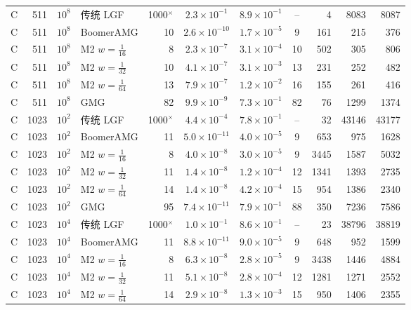\begin{longtable}{lrrlrcccrrr}
C & 511 & $10^{8}$ & 传统 LGF & 1000$^\times$ & $2.3{\times}10^{-1}$ & $8.9{\times}10^{-1}$ & -- & 4 & 8083 & 8087 \\
C & 511 & $10^{8}$ & BoomerAMG & 10 & $2.6{\times}10^{-10}$ & $1.7{\times}10^{-5}$ & 9 & 161 & 215 & 376 \\
C & 511 & $10^{8}$ & M2 $w{=}\frac1{16}$ & 8 & $2.3{\times}10^{-7}$ & $3.1{\times}10^{-4}$ & 10 & 502 & 305 & 806 \\
C & 511 & $10^{8}$ & M2 $w{=}\frac1{32}$ & 10 & $4.1{\times}10^{-7}$ & $3.1{\times}10^{-3}$ & 13 & 231 & 252 & 482 \\
C & 511 & $10^{8}$ & M2 $w{=}\frac1{64}$ & 13 & $7.9{\times}10^{-7}$ & $1.2{\times}10^{-2}$ & 16 & 155 & 261 & 416 \\
C & 511 & $10^{8}$ & GMG & 82 & $9.9{\times}10^{-9}$ & $7.3{\times}10^{-1}$ & 82 & 76 & 1299 & 1374 \\
C & 1023 & $10^{2}$ & 传统 LGF & 1000$^\times$ & $4.4{\times}10^{-4}$ & $7.8{\times}10^{-1}$ & -- & 32 & 43146 & 43177 \\
C & 1023 & $10^{2}$ & BoomerAMG & 11 & $5.0{\times}10^{-11}$ & $4.0{\times}10^{-5}$ & 9 & 653 & 975 & 1628 \\
C & 1023 & $10^{2}$ & M2 $w{=}\frac1{16}$ & 8 & $4.0{\times}10^{-8}$ & $3.0{\times}10^{-5}$ & 9 & 3445 & 1587 & 5032 \\
C & 1023 & $10^{2}$ & M2 $w{=}\frac1{32}$ & 11 & $1.4{\times}10^{-8}$ & $1.2{\times}10^{-4}$ & 12 & 1341 & 1393 & 2735 \\
C & 1023 & $10^{2}$ & M2 $w{=}\frac1{64}$ & 14 & $1.4{\times}10^{-8}$ & $4.2{\times}10^{-4}$ & 15 & 954 & 1386 & 2340 \\
C & 1023 & $10^{2}$ & GMG & 95 & $7.4{\times}10^{-11}$ & $7.9{\times}10^{-1}$ & 88 & 350 & 7236 & 7586 \\
C & 1023 & $10^{4}$ & 传统 LGF & 1000$^\times$ & $1.0{\times}10^{-1}$ & $8.6{\times}10^{-1}$ & -- & 23 & 38796 & 38819 \\
C & 1023 & $10^{4}$ & BoomerAMG & 11 & $8.8{\times}10^{-11}$ & $9.0{\times}10^{-5}$ & 9 & 648 & 952 & 1599 \\
C & 1023 & $10^{4}$ & M2 $w{=}\frac1{16}$ & 8 & $6.3{\times}10^{-8}$ & $2.8{\times}10^{-5}$ & 9 & 3438 & 1446 & 4884 \\
C & 1023 & $10^{4}$ & M2 $w{=}\frac1{32}$ & 11 & $5.1{\times}10^{-8}$ & $2.8{\times}10^{-4}$ & 12 & 1281 & 1271 & 2552 \\
C & 1023 & $10^{4}$ & M2 $w{=}\frac1{64}$ & 14 & $2.9{\times}10^{-8}$ & $1.3{\times}10^{-3}$ & 15 & 950 & 1406 & 2355 \\

\end{longtable}
